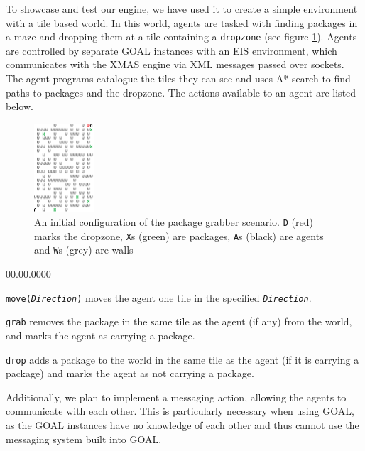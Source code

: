 To showcase and test our engine, we have used it to create a simple
environment with a tile based world. In this world, agents are tasked
with finding packages in a maze and dropping them at a tile containing
a \texttt{dropzone} (see figure \ref{fig:maze-scrot}). Agents are
controlled by separate GOAL instances with an EIS environment, which
communicates with the XMAS engine via XML messages passed over sockets.
The agent programs catalogue the tiles they can see and uses A{*}
search to find paths to packages and the dropzone. The actions available
to an agent are listed below.

\begin{figure}
\begin{centering}
\includegraphics[width=0.2\textwidth]{TileWorldColoredScrot}
\par\end{centering}

\caption{An initial configuration of the package grabber scenario. \texttt{D}
(red) marks the dropzone, \texttt{X}s (green) are packages, \texttt{A}s
(black) are agents and \texttt{W}s (grey) are walls\label{fig:maze-scrot}}
\end{figure}

\begin{lyxlist}{00.00.0000}
\item [{\texttt{move(}\texttt{\emph{Direction}}\texttt{)}}] moves the agent
one tile in the specified \texttt{\emph{Direction}}.
\item [{\texttt{grab}}] removes the package in the same tile as the agent
(if any) from the world, and marks the agent as carrying a package.
\item [{\texttt{drop}}] adds a package to the world in the same tile as
the agent (if it is carrying a package) and marks the agent as not
carrying a package.
\end{lyxlist}
Additionally, we plan to implement a messaging action, allowing the
agents to communicate with each other. This is particularly necessary
when using GOAL, as the GOAL instances have no knowledge of each other
and thus cannot use the messaging system built into GOAL.
